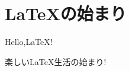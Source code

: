 \documentclass[a4paper]{jsarticle}
\begin{document}
\section{\LaTeX の始まり}
Hello,\LaTeX !

楽しい\LaTeX 生活の始まり!
\end{document}
